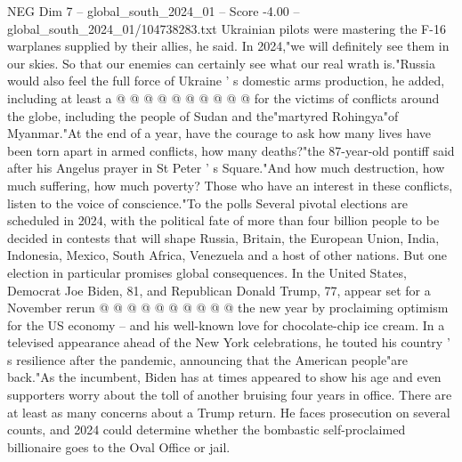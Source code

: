 \begin{textsample}{NEG Dim 7 – global\_south\_2024\_01 – Score -4.00 – global\_south\_2024\_01/104738283.txt}
Ukrainian pilots were mastering the F-16 warplanes supplied by their allies, he said.
In 2024,"we will definitely see them in our skies.
So that our enemies can certainly see what our real wrath is."Russia would also feel the full force of Ukraine ' s domestic arms production, he added, including at least a @ @ @ @ @ @ @ @ @ @ for the victims of conflicts around the globe, including the people of Sudan and the"martyred Rohingya"of Myanmar."At the end of a year, have the courage to ask how many lives have been torn apart in armed conflicts, how many deaths?"the 87-year-old pontiff said after his Angelus prayer in St Peter ' s Square."And how much destruction, how much suffering, how much poverty?
Those who have an interest in these conflicts, listen to the voice of conscience."To the polls Several pivotal elections are scheduled in 2024, with the political fate of more than four billion people to be decided in contests that will shape Russia, Britain, the European Union, India, Indonesia, Mexico, South Africa, Venezuela and a host of other nations.
But one election in particular promises global consequences.
In the United States, Democrat Joe Biden, 81, and Republican Donald Trump, 77, appear set for a November rerun @ @ @ @ @ @ @ @ @ @ the new year by proclaiming optimism for the US economy -- and his well-known love for chocolate-chip ice cream.
In a televised appearance ahead of the New York celebrations, he touted his country ' s resilience after the pandemic, announcing that the American people"are back."As the incumbent, Biden has at times appeared to show his age and even supporters worry about the toll of another bruising four years in office.
There are at least as many concerns about a Trump return.
He faces prosecution on several counts, and 2024 could determine whether the bombastic self-proclaimed billionaire goes to the Oval Office or jail.

\end{textsample}
